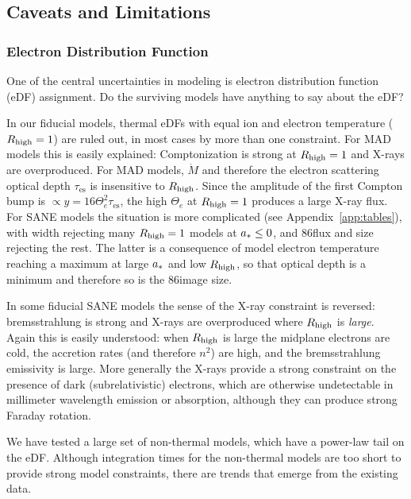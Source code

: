\subsection{Caveats and Limitations}\label{sec:limits}

\subsubsection{Electron Distribution Function}

One of the central uncertainties in modeling \sgra is electron distribution function (eDF) assignment.
Do the surviving models have anything to say about the eDF?

In our fiducial models, thermal eDFs with equal ion and electron temperature ($R_\mathrm{high} = 1$) are ruled out, in most cases by more than one constraint.
For MAD models this is easily explained: Comptonization is strong at $R_\mathrm{high} = 1$ and X-rays are overproduced.
For MAD models, $\dot{M}$ and therefore the electron scattering optical depth $\tau_\mathrm{es}$ is insensitive to $R_\mathrm{high}$.
Since the amplitude of the first Compton bump is $\propto y = 16 \Theta_e^2 \tau_\mathrm{es}$, the high $\Theta_e$ at $R_\mathrm{high} = 1$ produces a large X-ray flux.
For SANE models the situation is more complicated (see Appendix~\ref{app:tables}), with \mring width rejecting many $R_\mathrm{high} = 1$ models at $a_* \le 0$, and 86\GHz flux and size rejecting the rest.
The latter is a consequence of model electron temperature reaching a maximum at large $a_*$ and low $R_\mathrm{high}$, so that optical depth is a minimum and therefore so is the 86\GHz image size.

In some fiducial SANE models the sense of the X-ray constraint is reversed: bremsstrahlung is strong and X-rays are overproduced where $R_\mathrm{high}$ is {\em large}.
Again this is easily understood: when $R_\mathrm{high}$ is large the midplane electrons are cold, the accretion rates (and therefore $n^2$) are high, and the bremsstrahlung emissivity is large.
More generally the X-rays provide a strong constraint on the presence of dark (subrelativistic) electrons, which are otherwise undetectable in millimeter wavelength emission or absorption, although they can produce strong Faraday rotation.

We have tested a large set of non-thermal models, which have a power-law tail on the eDF.
Although integration times for the non-thermal models are too short to provide strong model constraints, there are trends that emerge from the existing data.

